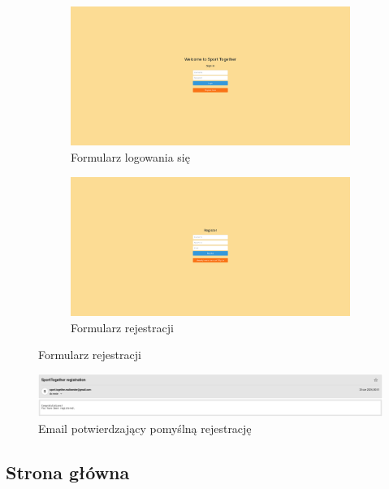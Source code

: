 \documentclass[11pt,a4paper]{article}
\begin{document}
\begin{figure}[H]
    \centering
    \captionsetup{justification=centering,margin=2cm}
        \begin{subfigure}{0.49\textwidth}
            \includegraphics[width=\textwidth]{pages/login_page.png}
            \caption{Formularz logowania się}
        \end{subfigure}
    \hfill
        \begin{subfigure}{0.49\textwidth}
            \includegraphics[width=\textwidth]{pages/register.png}
            \caption{Formularz rejestracji}
        \end{subfigure}
\end{figure}

\begin{figure} [H]
    \centering
    \includegraphics[width=1\linewidth]{pages/email.png}
    \caption{Email potwierdzający pomyślną rejestrację}
\end{figure}

\subsection{Strona główna}
\end{document}
